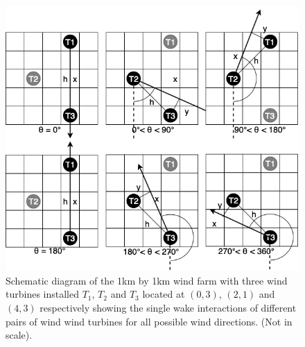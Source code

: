 	\begin{figure}[H]
        \centering
        \includegraphics[width=\textwidth]{Figures/032143.png}
        \caption{Schematic diagram of the 1km by 1km wind farm with three wind turbines installed $T_1$, $T_2$ and $T_3$ located at $(0,3)$, $(2,1)$ and $(4,3)$ respectively showing the single wake interactions of different pairs of wind wind turbines for all possible wind directions. (Not in scale).}
        \label{032143}
    \end{figure}
    
